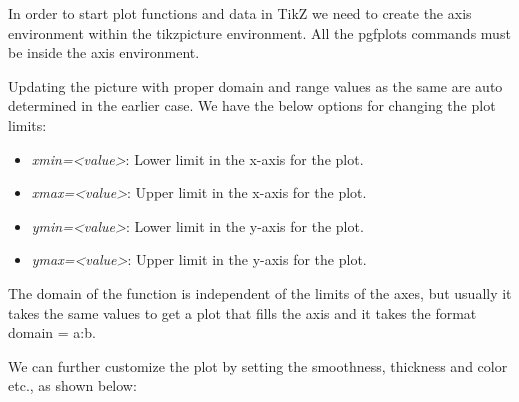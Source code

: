 \documentclass[12]{article}
\begin{document}
    In order to start plot functions and data in \textrm{TikZ} we need to create the axis environment within the \textsf{tikzpicture} environment. All the \textsf{pgfplots} commands must be inside the axis environment.
    

    Updating the picture with proper domain and range values as the same are auto determined in the earlier case. We have the below options for changing the plot limits:

    \begin{itemize}
        \item \textit{xmin=<value>}: Lower limit in the x-axis for the plot.
        \item \textit{xmax=<value>}: Upper limit in the x-axis for the plot.
        \item \textit{ymin=<value>}: Lower limit in the y-axis for the plot.
        \item \textit{ymax=<value>}: Upper limit in the y-axis for the plot.
    \end{itemize}

    The domain of the function is independent of the limits of the axes, but usually it takes the same values to get a plot that fills the axis and it takes the format \textsf{domain = a:b}.


    We can further customize the plot by setting the smoothness, thickness and color etc., as shown below:
\end{document}
